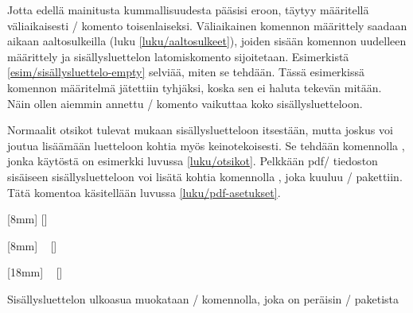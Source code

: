 Jotta edellä mainitusta kummallisuudesta pääsisi eroon, täytyy
määritellä väliaikaisesti \-/ komento
toisenlaiseksi. Väliaikainen komennon määrittely saadaan aikaan
aaltosulkeilla (luku \ref{luku/aaltosulkeet}), joiden sisään komennon
uudelleen määrittely ja sisällysluettelon latomiskomento sijoitetaan.
Esimerkistä \ref{esim/sisällysluettelo-empty} selviää, miten se tehdään.
Tässä esimerkissä komennon määritelmä jätettiin tyhjäksi, koska sen ei
haluta tekevän mitään. Näin ollen aiemmin annettu \-/
komento vaikuttaa koko sisällysluetteloon.

Normaalit otsikot tulevat mukaan sisällysluetteloon itsestään, mutta
joskus voi joutua lisäämään luetteloon kohtia myös keinotekoisesti. Se
tehdään komennolla , jonka käytöstä on
esimerkki luvussa \ref{luku/otsikot}. Pelkkään pdf\-/ tiedoston
sisäiseen sisällysluetteloon voi lisätä kohtia komennolla
, joka kuuluu \-/ pakettiin.
Tätä komentoa käsitellään luvussa \ref{luku/pdf-asetukset}.

\begin{esimerkki*}

\begin{koodilohko}
[8mm]                                       %
{\addvspace{1.5ex}\rmfamily\bfseries\large} %
{\contentslabel{8mm}}                       %
{\hspace{-8mm}}                             %
{\small\titlerule[0bp]\contentspage}  %
[\addvspace{.5ex}]                    %

[8mm]                                       %
{\addvspace{.5ex}\rmfamily\normalsize}      %
{\contentslabel{8mm}}                       %
{}                                          %
{~\small{}\contentspage}   %
[\addvspace{.2ex}]                          %

[18mm]                                      %
{\rmfamily\small}                           %
{\contentslabel{10mm}}                      %
{}                                          %
{~\small{}\contentspage}   %
[]                                          %
\end{koodilohko}
  \caption{Sisällysluettelon ulkoasua muokataan \-/
    komennolla, joka on peräisin \-/ paketista}
  \label{esim/titlecontents}
\end{esimerkki*}

